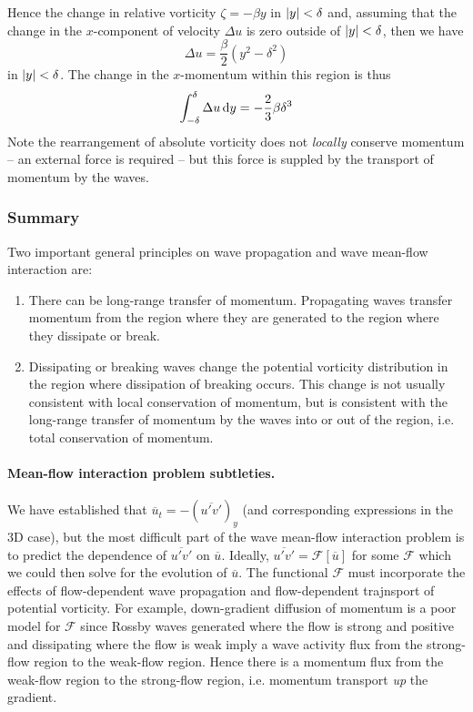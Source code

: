 \documentclass{jknotes}
\begin{document}
Hence the change in relative vorticity $\zeta = -\beta y$ in $\abs{y} <
\delta$ and, assuming that the change in the $x$-component of velocity $\Delta
u$ is zero outside of $\abs{y} < \delta$, then we have
\begin{equation}
	\Delta u = \frac{\beta}{2}(y^2-\delta^2)
\end{equation}
in $\abs{y} < \delta$. The change in the $x$-momentum within this region is
thus
\begin{equation}
	\int_{-\delta}^\delta \Delta u \, \diffd y = -\frac{2}{3}\beta \delta^3
\end{equation}
Note the rearrangement of absolute vorticity does not \emph{locally} conserve
momentum -- an external force is required -- but this force is suppled by the
transport of momentum by the waves.

\subsubsection{Summary}
Two important general principles on wave propagation and wave mean-flow
interaction are:
\begin{enumerate}
	\item There can be long-range transfer of momentum. Propagating waves
		transfer momentum from the region where they are generated to the
		region where they dissipate or break.
	\item Dissipating or breaking waves change the potential vorticity
		distribution in the region where dissipation of breaking occurs. This
		change is not usually consistent with local conservation of momentum,
		but is consistent with the long-range transfer of momentum by the
		waves into or out of the region, i.e. total conservation of momentum.
\end{enumerate}

\paragraph{Mean-flow interaction problem subtleties.}
We have established that $\overline{u}_t = -(\overline{u'v'})_y$ (and
corresponding expressions in the 3D case), but the most difficult part of the
wave mean-flow interaction problem is to predict the dependence of
$\overline{u'v'}$ on $\overline{u}$. Ideally, $\overline{u'v'} =
\mathcal{F}\!\left[\overline{u}\right]$ for some $\mathcal{F}$ which we could
then solve for the evolution of $\overline{u}$. The functional $\mathcal{F}$
must incorporate the effects of flow-dependent wave propagation and
flow-dependent trajnsport of potential vorticity. For example, down-gradient
diffusion of momentum is a poor model for $\mathcal{F}$ since Rossby waves
generated where the flow is strong and positive and dissipating where the flow
is weak imply a wave activity flux from the strong-flow region to the
weak-flow region. Hence there is a momentum flux from the weak-flow region to
the strong-flow region, i.e. momentum transport \emph{up} the gradient. 
\end{document}
